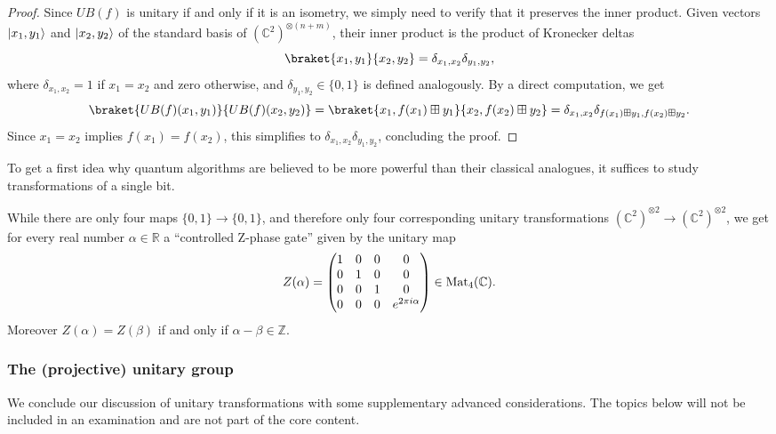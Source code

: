 \documentclass[a4paper, oneside, 12pt]{amsart}
\begin{document}
\begin{proof}
  Since \(UB(f)\) is unitary if and only if it is an isometry, we simply need to verify that it preserves the inner product.
  Given vectors \( \lvert x_1, y_1\rangle \) and \( \lvert x_2, y_2\rangle \) of the standard basis of \( (\mathbb{C}^2)^{\otimes (n+m)} \), their inner product is the product of Kronecker deltas
  \begin{equation*}
    \braket{x_1, y_1}{x_2, y_2} = \delta_{x_1,x_2} \delta_{y_1,y_2},
  \end{equation*}
  where \(\delta_{x_{1}, x_{2}} = 1\) if \(x_{1} = x_{2}\) and zero otherwise, and \(\delta_{y_{1}, y_{2}} \in\{0,1\}\) is defined analogously.
  By a direct computation, we get
  \begin{equation*}
    \braket{UB(f)(x_1, y_1)}{UB(f)(x_2, y_2)}
    = \braket{x_1, f(x_1) \boxplus y_1}{x_2, f(x_2) \boxplus y_2}= \delta_{x_{1}, x_{2}} \delta_{f(x_1) \boxplus y_1, f(x_2) \boxplus y_2}.
  \end{equation*}
  Since \( x_1 = x_2 \) implies \( f(x_1) = f(x_2) \), this simplifies to \(\delta_{x_1,x_2} \delta_{y_1,y_2}\), concluding the proof.
\end{proof}

To get a first idea why quantum algorithms are believed to be more powerful than their classical analogues, it suffices to study transformations of a single bit.

\begin{remark}\label{rmk:only-few-trafos-are-quantum}
  While there are only four maps \(\{0,1\}\to\{0,1\}\), and therefore only four corresponding unitary transformations \( (\mathbb{C}^{2})^{\otimes 2} \to ( \mathbb{C}^{2})^{\otimes 2}\), we get for every real number \(\alpha \in \mathbb{R}\) a ``controlled Z-phase gate'' given by the unitary map
  \begin{equation*}
    Z(\alpha) =
    \begin{pmatrix}
      1 & 0 & 0 & 0 \\
      0 & 1 & 0 & 0 \\
      0 & 0 & 1 & 0 \\
      0 & 0 & 0 & e^{2\pi i \alpha}
    \end{pmatrix} \in \operatorname{Mat}_{4}( \mathbb{C}).
  \end{equation*}
  Moreover \( Z(\alpha) = Z(\beta)\) if and only if \(\alpha- \beta \in \mathbb{Z}\).
\end{remark}

\subsubsection{The (projective) unitary group}\label{sec:the-(projective)-unitary-group}
We conclude our discussion of unitary transformations with some supplementary advanced considerations.
The topics below will not be included in an examination and are not part of the core content.
\end{document}
